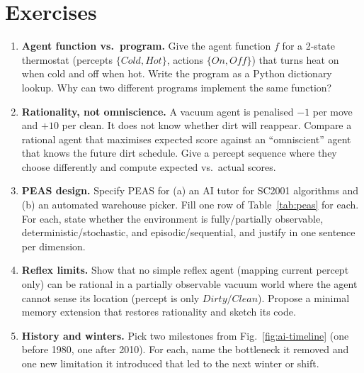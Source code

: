 \section{Exercises}
\label{sec:ch01-exercises}
\begin{enumerate}[label=E1.\arabic*, leftmargin=*, itemsep=0.7em]
    \item \textbf{Agent function vs.\ program.} Give the agent function $f$ for a 2-state thermostat (percepts $\{\textit{Cold},\textit{Hot}\}$, actions $\{\textit{On},\textit{Off}\}$) that turns heat on when cold and off when hot. Write the program as a Python dictionary lookup. Why can two different programs implement the same function?
    \item \textbf{Rationality, not omniscience.} A vacuum agent is penalised $-1$ per move and $+10$ per clean. It does not know whether dirt will reappear. Compare a rational agent that maximises expected score against an ``omniscient'' agent that knows the future dirt schedule. Give a percept sequence where they choose differently and compute expected vs.\ actual scores.
    \item \textbf{PEAS design.} Specify PEAS for (a) an AI tutor for SC2001 algorithms and (b) an automated warehouse picker. Fill one row of Table~\ref{tab:peas} for each. For each, state whether the environment is fully/partially observable, deterministic/stochastic, and episodic/sequential, and justify in one sentence per dimension.
    \item \textbf{Reflex limits.} Show that no simple reflex agent (mapping current percept only) can be rational in a partially observable vacuum world where the agent cannot sense its location (percept is only $\textit{Dirty}/\textit{Clean}$). Propose a minimal memory extension that restores rationality and sketch its code.
    \item \textbf{History and winters.} Pick two milestones from Fig.~\ref{fig:ai-timeline} (one before 1980, one after 2010). For each, name the bottleneck it removed and one new limitation it introduced that led to the next winter or shift.
\end{enumerate}
